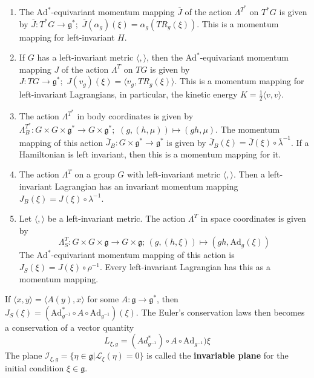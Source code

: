 \begin{thm}\label{thm:3}

    \begin{enumerate}
        \item The $\mathrm{Ad}^*$-equivariant momentum mapping $\overline{J}$ of the action $\Lambda^{T^*}$ on $T^*G$ is given by $\overline{J}: T^*G \to \mathfrak{g}^*; \hspace{4pt} \overline{J}(\alpha_g)(\xi) = \alpha_g(TR_g(\xi))$. This is a momentum mapping for left-invariant $H$.
        \item If $G$ has a left-invariant metric $\langle, \rangle$, then the $\mathrm{Ad}^*$-equivariant momentum mapping $J$ of the action $\Lambda^T$ on $TG$ is given by $J: TG \to \mathfrak{g}^*; \hspace{4pt} J(v_g)(\xi) = \langle v_g, TR_g(\xi) \rangle$. This is a momentum mapping for left-invariant Lagrangians, in particular, the kinetic energy $K = \frac{1}{2}\langle v, v \rangle$.
        \item The action $\Lambda^{T^*}$ in body coordinates is given by $\Lambda^{T^*}_B: G \times G \times \mathfrak{g}^* \to G \times \mathfrak{g}^*; \hspace{4pt} (g,(h,\mu)) \mapsto (gh,\mu)$. The momentum mapping of this action $\overline{J}_B: G \times \mathfrak{g}^* \to \mathfrak{g}^*$ is given by $\overline{J}_B(\xi) = \overline{J}(\xi) \circ \overline{\lambda}^{-1}$. If a Hamiltonian is left invariant, then this is a momentum mapping for it.
        \item The action $\Lambda^T$ on a group $G$ with left-invariant metric $\langle , \rangle$. Then a left-invariant Lagrangian has an invariant momentum mapping $J_B(\xi) = J(\xi) \circ \lambda^{-1}$.
        \item Let $\langle , \rangle$ be a left-invariant metric. The action $\Lambda^T$ in space coordinates is given by 
        \begin{equation}\Lambda^T_S: G \times G \times \mathfrak{g} \to G \times \mathfrak{g}; \hspace{2pt} (g,(h,\xi)) \mapsto (gh, \mathrm{Ad}_g(\xi))\end{equation}
        The $\mathrm{Ad}^*$-equivariant momentum mapping of this action is $J_S(\xi) = J(\xi) \circ \rho^{-1}$. Every left-invariant Lagrangian has this as a momentum mapping.
    \end{enumerate}
\end{thm}

If $\langle x, y \rangle = \langle A(y), x \rangle$ for some $A:\mathfrak{g} \to \mathfrak{g}^*$, then $J_S(\xi) = (\mathrm{Ad}^*_{g^{-1}} \circ A \circ \mathrm{Ad}_{g^{-1}})(\xi)$. The Euler's conservation laws then becomes a conservation of a vector quantity 
\begin{equation}L_{\xi,g} = (Ad^*_{g^{-1}}) \circ A \circ \mathrm{Ad}_{g^{-1}}) \xi\end{equation}
The plane $\mathcal{I}_{\xi, g} = \{ \eta \in \mathfrak{g} \vert \mathcal{L}_{\xi} (\eta) = 0 \}$ is called the \textbf{invariable plane} for the initial condition $\xi \in \mathfrak{g}$.

